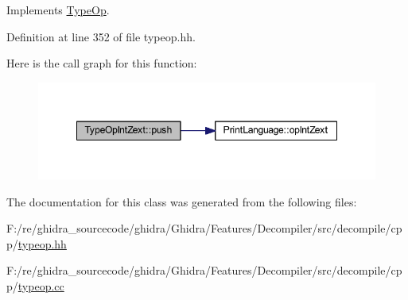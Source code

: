 Implements \mbox{\hyperlink{class_type_op_ac9c9544203ed74dabe6ac662b653b2af}{Type\+Op}}.



Definition at line 352 of file typeop.\+hh.

Here is the call graph for this function\+:
\nopagebreak
\begin{figure}[H]
\begin{center}
\leavevmode
\includegraphics[width=348pt]{class_type_op_int_zext_a0b10f9f82e0b78957f8d83339c31626e_cgraph}
\end{center}
\end{figure}


The documentation for this class was generated from the following files\+:\begin{DoxyCompactItemize}
\item 
F\+:/re/ghidra\+\_\+sourcecode/ghidra/\+Ghidra/\+Features/\+Decompiler/src/decompile/cpp/\mbox{\hyperlink{typeop_8hh}{typeop.\+hh}}\item 
F\+:/re/ghidra\+\_\+sourcecode/ghidra/\+Ghidra/\+Features/\+Decompiler/src/decompile/cpp/\mbox{\hyperlink{typeop_8cc}{typeop.\+cc}}\end{DoxyCompactItemize}
